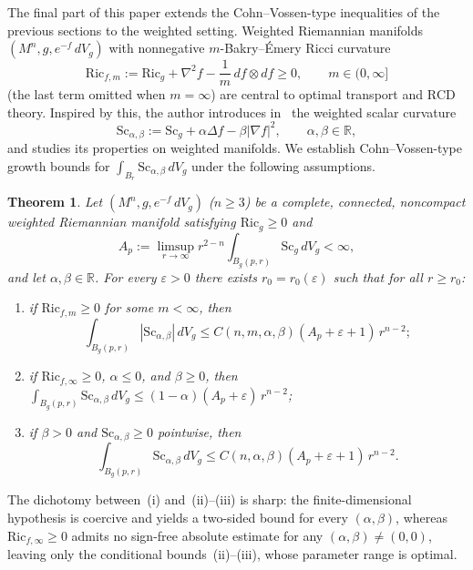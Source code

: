 \documentclass[12pt,oneside,a4paper]{article}
\newtheorem{theoremC}{Theorem}
\theoremstyle{mytheorem}
\theoremstyle{remark}
\begin{document}
The final part of this paper extends the Cohn--Vossen-type inequalities of
the previous sections to the weighted setting. Weighted Riemannian manifolds
$(M^n,g,e^{-f}\,dV_g)$ with nonnegative $m$-Bakry--\'Emery Ricci curvature
\[
  \mathrm{Ric}_{f,m}
  :=\mathrm{Ric}_g+\nabla^2 f-\frac{1}{m}\,df\otimes df\ge 0,
  \qquad m\in(0,\infty]
\]
(the last term omitted when $m=\infty$) are central to optimal transport and
$\mathrm{RCD}$ theory. Inspired by this, the author introduces
in~\cite[Section~4]{zbMATH07342230} the weighted scalar curvature
\[
  \mathrm{Sc}_{\alpha,\beta}
  :=\mathrm{Sc}_g+\alpha\Delta f-\beta|\nabla f|^2,
  \qquad\alpha,\beta\in\mathbb{R},
\]
and studies its properties on weighted manifolds. We establish
Cohn--Vossen-type growth bounds for $\int_{B_r}\mathrm{Sc}_{\alpha,\beta}\,dV_g$
under the following assumptions.

\begin{theoremC}\label{thm:intro-weighted}
Let $(M^n,g,e^{-f}\,dV_g)$ ($n\ge 3$) be a complete, connected,
noncompact weighted Riemannian manifold satisfying $\mathrm{Ric}_g\ge 0$ and
\[
  A_p:=\limsup_{r\to\infty}r^{2-n}\int_{B_g(p,r)}\mathrm{Sc}_g\,dV_g<\infty,
\]
and let $\alpha,\beta\in\mathbb{R}$.
For every $\varepsilon>0$ there exists $r_0=r_0(\varepsilon)$ such that for
all $r\ge r_0$:
\begin{enumerate}
\item[\textup{(i)}] if $\mathrm{Ric}_{f,m}\ge 0$ for some $m<\infty$, then
$$\displaystyle\int_{B_g(p,r)}|\mathrm{Sc}_{\alpha,\beta}|\,dV_g
\le C(n,m,\alpha,\beta)(A_p+\varepsilon+1)\,r^{n-2};$$
\item[\textup{(ii)}] if $\mathrm{Ric}_{f,\infty}\ge 0$, $\alpha\le 0$, and
$\beta\ge 0$, then
$\displaystyle\int_{B_g(p,r)}\mathrm{Sc}_{\alpha,\beta}\,dV_g
\le(1-\alpha)(A_p+\varepsilon)\,r^{n-2}$;
\item[\textup{(iii)}] if $\beta>0$ and $\mathrm{Sc}_{\alpha,\beta}\ge 0$
pointwise, then
$$\displaystyle\int_{B_g(p,r)}\mathrm{Sc}_{\alpha,\beta}\,dV_g
\le C(n,\alpha,\beta)(A_p+\varepsilon+1)\,r^{n-2}.$$
\end{enumerate}
\end{theoremC}

The dichotomy between~\textup{(i)} and~\textup{(ii)}--\textup{(iii)} is
sharp: the finite-dimensional hypothesis is coercive and yields a two-sided
bound for every $(\alpha,\beta)$, whereas $\mathrm{Ric}_{f,\infty}\ge 0$
admits no sign-free absolute estimate for any $(\alpha,\beta)\ne(0,0)$,
leaving only the conditional bounds~\textup{(ii)}--\textup{(iii)}, whose
parameter range is optimal.
\end{document}
